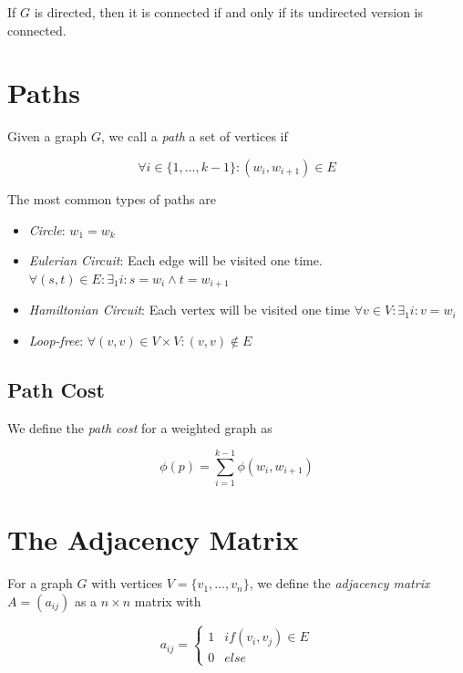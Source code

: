  If \(G\) is directed, then it is connected if and only if its undirected version is connected.
 
 \section{Paths}

 Given a graph \(G\), we call a \emph{path} a set of vertices if 

 \[
    \forall i \in \{1, \dots, k - 1\} : (w_i, w_{i + 1}) \in E
 \]

 The most common types of paths are 

\begin{itemize}
    
    \item \emph{Circle}: \(w_1 = w_k\)

    \item \emph{Eulerian Circuit}: Each edge will be visited one time. \(\forall(s,t) \in E : \exists_1 i: s = w_i \land t = w_{i + 1}\)

    \item \emph{Hamiltonian Circuit}: Each vertex will be visited one time \(\forall v \in V : \exists_1 i : v = w_i\) 
    
    \item \emph{Loop-free}: \(\forall(v,v) \in V \times V : (v,v) \notin E \)

 \end{itemize}

 \subsection{Path Cost}

 We define the \emph{path cost} for a weighted graph as 

 \[
    \phi (p) = \sum_{i = 1}^{k - 1} \phi(w_i, w_{i+1})
 \]

 \section{The Adjacency Matrix}

 For a graph \(G\) with vertices \(V = \{v_1, \dots, v_n\}\), we define the \emph{adjacency matrix} \(A = (a_{ij})\) as a 
 \(n \times n\) matrix with 

 \[
    a_{ij} = \begin{cases}
        1 & if (v_i, v_j) \in E \\ 
        0 & else
    \end{cases}
 \]

